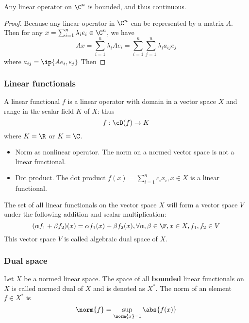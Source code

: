 \begin{refsection}
\begin{theorem}
\cite[141]{debnath2005hilbert}Any linear operator on $\C^n$ is bounded, and thus continuous.
\end{theorem}
\begin{proof}
Because any linear operator in $\C^n$ can be represented by a matrix $A$. Then for any $x = \sum_{i=1}^n \lambda_i e_i \in \C^n$, we have
$$Ax = \sum_{i=1}^n \lambda_i Ae_i = \sum_{i=1}^n\sum_{j=1}^n \lambda_i a_{ij} e_j$$
where $a_{ij} = \ip{Ae_i,e_j}$
Then 	
\end{proof}


\subsubsection{Linear functionals}
\begin{definition}
A linear functional $f$ is a linear operator with domain in a vector space $X$ and range in the scalar field $K$ of $X$: thus
$$f:\cD(f)\to K$$
where $K=\R$ or $K=\C$.
\end{definition}

\begin{example}\hfill
\begin{itemize}
    \item Norm as nonlinear operator. The norm on a normed vector space is not a linear functional.
    \item Dot product. The dot product $f(x)=\sum_{i=1}^n c_i x_i,x\in X$ is a linear functional.
\end{itemize}
\end{example}




\begin{definition}
The set of all linear functionals on the vector space $X$ will form a vector space $V$ under the following addition and scalar multiplication:
$$(\alpha f_1 + \beta f_2 ) (x) = \alpha f_1(x) + \beta f_2(x),\forall \alpha,\beta \in \F, x\in X,f_1,f_2 \in V$$
This vector space $V$ is called algebraic dual space of $X$.
\end{definition}

\subsubsection{Dual space}
\begin{definition}\cite[106]{luenberger1969optimization}
Let $X$ be a normed linear space. The space of all \textbf{bounded} linear functionals on $X$ is called normed dual of $X$ and is denoted as $X^*$. The norm of an element $f\in X^*$ is
$$\norm{f} = \sup_{\norm{x}=  1} \abs{f(x)}$$
\end{definition}


\end{refsection}
